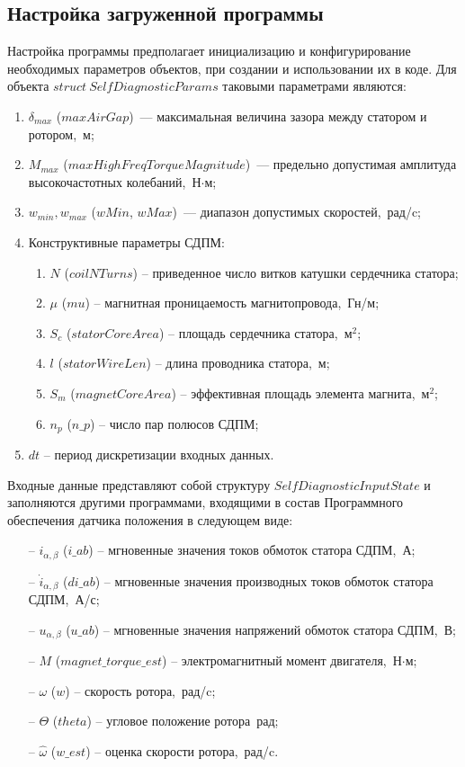 \subsection{Настройка загруженной программы}

Настройка программы предполагает инициализацию и конфигурирование необходимых параметров объектов, при создании и использовании их в коде.
Для объекта $struct\ SelfDiagnosticParams$ таковыми параметрами являются:
\begin{enumerate}
    \item $\delta_{max}$ ($maxAirGap$)~--- максимальная величина зазора между статором и ротором,~м;
    \item $M_{max}$ ($maxHighFreqTorqueMagnitude$)~--- предельно допустимая амплитуда высокочастотных колебаний,~Н$\cdot$м;
    \item $w_{min}, w_{max}$ ($wMin$, $wMax$)~--- диапазон допустимых скоростей,~рад/c;
    \item Конструктивные параметры СДПМ:
    \begin{enumerate}
        \item $N$ ($coilNTurns$) -- приведенное число витков катушки сердечника статора;
        \item $\mu$ ($mu$) -- магнитная проницаемость магнитопровода,~Гн/м;
        \item $S_c$ ($statorCoreArea$) -- площадь сердечника статора,~м$^2$;
        \item $l$ ($statorWireLen$) -- длина проводника статора,~м;
        \item $S_m$ ($magnetCoreArea$) --  эффективная площадь элемента магнита,~м$^2$;
        \item $n_p$ ($n\_p$) -- число пар полюсов СДПМ;
    \end{enumerate}
    \item $dt$ -- период дискретизации входных данных.
\end{enumerate}

Входные данные представляют собой структуру $SelfDiagnosticInputState$ и заполняются другими программами, входящими в состав Программного обеспечения датчика положения в следующем виде:
\begin{enumerate}
    \item[--] $i_{\alpha, \beta}$ ($i\_ab$) -- мгновенные значения токов обмоток статора СДПМ,~А;
    \item[--] $\dot{i}_{\alpha, \beta}$ ($di\_ab$) -- мгновенные значения производных токов обмоток статора СДПМ,~А/с;
    \item[--] $u_{\alpha, \beta}$ ($u\_ab$) -- мгновенные значения напряжений обмоток статора СДПМ,~В;
    \item[--] $M$ ($magnet\_torque\_est$) -- электромагнитный момент двигателя,~Н$\cdot$м;
    \item[--] $\omega$ ($w$) -- скорость ротора,~рад/c;
    \item[--] $\Theta$ ($theta$) -- угловое положение ротора~рад;
    \item[--] $\hat{\omega}$ ($w\_est$) -- оценка скорости ротора,~рад/c.
\end{enumerate}
